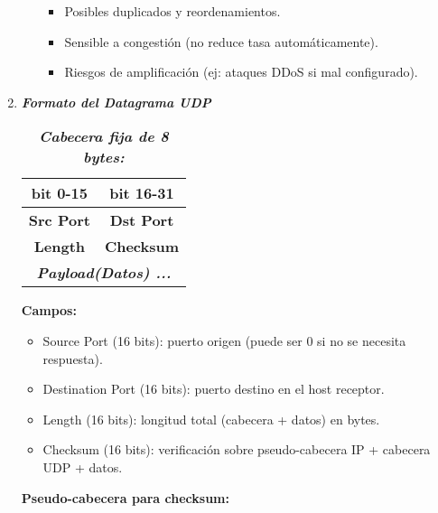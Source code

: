 \documentclass[12pt]{amsart}
\begin{document}
\begin{enumerate}
\begin{itemize}
\begin{itemize}
			\item Posibles duplicados y reordenamientos.

			\item Sensible a congestión (no reduce tasa automáticamente).

			\item Riesgos de amplificación (ej: ataques DDoS si mal configurado).

			\end{itemize}

		\end{itemize}
	
		\bigskip\bigskip

		\item \textbf{\textit{Formato del Datagrama UDP}}
		
		\medskip \medskip

		\begin{table}[ht]
		\centering
		\caption{\textbf{\textit{Cabecera fija de 8 bytes:}}}
		\begin{tabular}{|c|c|}
		\hline
		bit 0-15 & bit 16-31 \\ 
		\hline
		\textbf{Src Port} & \textbf{Dst Port} \\
		\hline
		\textbf{Length} & \textbf{Checksum} \\
		\hline
		\multicolumn{2}{|c|}{\textbf{\textit{Payload(Datos) ...}}} \\
		\hline
		\end{tabular}
		\label{tab:data_packet}
		\end{table}

		\noindent \textbf{Campos:}
		\begin{itemize}
		\item Source Port (16 bits): puerto origen (puede ser 0 si no se necesita respuesta).
		\item Destination Port (16 bits): puerto destino en el host receptor.
		\item Length (16 bits): longitud total (cabecera + datos) en bytes.
		\item Checksum (16 bits): verificación sobre pseudo-cabecera IP + cabecera UDP + datos.
		\end{itemize}
		
		\medskip \medskip		

		\noindent \textbf{Pseudo-cabecera para checksum:}

		\medskip


\end{enumerate}
\end{document}
